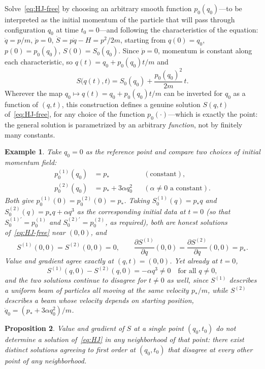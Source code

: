 \documentclass[11pt]{article}
\newtheorem{proposition}{Proposition}[section]
\newtheorem{example}[proposition]{Example}
\newcommand{\dd}[2]{\frac{\partial #1}{\partial #2}}
\begin{document}
Solve~\eqref{eq:HJ-free} by choosing an arbitrary smooth function $p_0(q_0)$---to be interpreted as the initial momentum of the particle that will pass through configuration $q_0$ at time $t_0=0$---and following the characteristics of the equation: $\dot q = p/m$, $\dot p = 0$, $\dot S = p\dot q - H = p^2/2m$, starting from $q(0)=q_0$, $p(0)=p_0(q_0)$, $S(0)=S_0(q_0)$. Since $\dot p=0$, momentum is constant along each characteristic, so $q(t)=q_0+p_0(q_0)t/m$ and
\begin{equation}
S\big(q(t),t\big) = S_0(q_0) + \frac{p_0(q_0)^2}{2m}\,t .
\end{equation}
Wherever the map $q_0\mapsto q(t)=q_0+p_0(q_0)t/m$ can be inverted for $q_0$ as a function of $(q,t)$, this construction defines a genuine solution $S(q,t)$ of~\eqref{eq:HJ-free}, for any choice of the function $p_0(\cdot)$---which is exactly the point: the general solution is parametrized by an arbitrary \emph{function}, not by finitely many constants.

\begin{example}
\label{ex:free-particle}
Take $q_0=0$ as the reference point and compare two choices of initial momentum field:
\begin{align}
p_0^{(1)}(q_0) &= p_* & &(\text{constant}),\\
p_0^{(2)}(q_0) &= p_* + 3\alpha q_0^2 & &(\alpha\neq 0 \text{ a constant}).
\end{align}
Both give $p_0^{(1)}(0)=p_0^{(2)}(0)=p_*$. Taking $S_0^{(1)}(q)=p_* q$ and $S_0^{(2)}(q)=p_* q+\alpha q^3$ as the corresponding initial data at $t=0$ (so that $S_0^{(1)\prime}=p_0^{(1)}$ and $S_0^{(2)\prime}=p_0^{(2)}$, as required), both are honest solutions of~\eqref{eq:HJ-free} near $(0,0)$, and
\begin{equation}
S^{(1)}(0,0)=S^{(2)}(0,0)=0, \qquad \dd{S^{(1)}}{q}(0,0)=\dd{S^{(2)}}{q}(0,0)=p_* .
\end{equation}
Value and gradient agree exactly at $(q,t)=(0,0)$. Yet already at $t=0$,
\begin{equation}
S^{(1)}(q,0)-S^{(2)}(q,0) = -\alpha q^3 \neq 0 \quad \text{for all } q\neq 0 ,
\end{equation}
and the two solutions continue to disagree for $t\neq0$ as well, since $S^{(1)}$ describes a uniform beam of particles all moving at the same velocity $p_*/m$, while $S^{(2)}$ describes a beam whose velocity depends on starting position, $\dot q_0=(p_*+3\alpha q_0^2)/m$.
\end{example}

\begin{proposition}
\label{prop:point-data-insufficient}
Value and gradient of $S$ at a single point $(q_0,t_0)$ do not determine a solution of~\eqref{eq:HJ} in any neighborhood of that point: there exist distinct solutions agreeing to first order at $(q_0,t_0)$ that disagree at every other point of any neighborhood.
\end{proposition}
\end{document}
